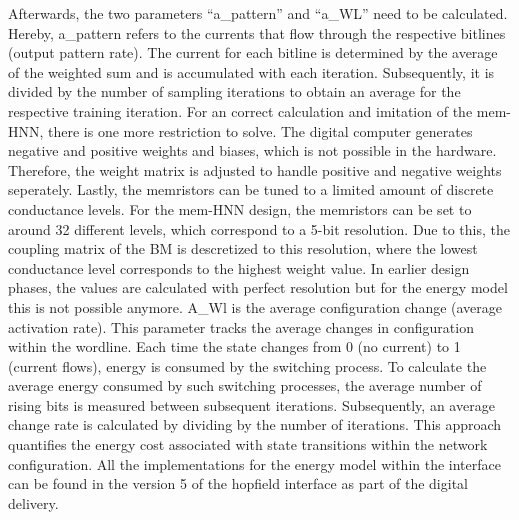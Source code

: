 Afterwards, the two parameters ``a\_pattern'' and ``a\_WL'' need to be calculated.
Hereby, a\_pattern refers to the currents that flow through the respective bitlines (output pattern rate).
The current for each bitline is determined by the average of the weighted sum and is accumulated with each iteration.
Subsequently, it is divided by the number of sampling iterations to obtain an average for the respective training iteration.
For an correct calculation and imitation of the \ac{mem-HNN}, there is one more restriction to solve. 
The digital computer generates negative and positive weights and biases, which is not possible in the hardware.
Therefore, the weight matrix is adjusted to handle positive and negative weights seperately. 
Lastly, the memristors can be tuned to a limited amount of discrete conductance levels.
For the \ac{mem-HNN} design, the memristors can be set to around 32 different levels, which correspond to a 5-bit resolution. 
Due to this, the coupling matrix of the \ac{BM} is descretized to this resolution, where the lowest conductance level corresponds to the highest weight value.
In earlier design phases, the values are calculated with perfect resolution but for the energy model this is not possible anymore. 
A\_Wl is the average configuration change (average activation rate).
This parameter tracks the average changes in configuration within the wordline.
Each time the state changes from 0 (no current) to 1 (current flows), energy is consumed by the switching process.
To calculate the average energy consumed by such switching processes, the average number of rising bits is measured between subsequent iterations.
Subsequently, an average change rate is calculated by dividing by the number of iterations.
This approach quantifies the energy cost associated with state transitions within the network configuration.
All the implementations for the energy model within the interface can be found in the version 5 of the hopfield interface as part of the digital delivery.

